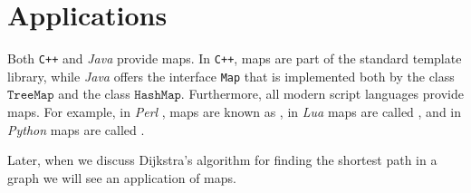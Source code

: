 \section{Applications}
Both \texttt{C++} and \textsl{Java} provide maps.  In \texttt{C++}, maps are part of the standard
template library, while \textsl{Java} offers the interface \texttt{Map} that is implemented both by
the class $\mathtt{TreeMap}$ and the class $\mathtt{HashMap}$. Furthermore, all modern script languages provide maps.
For example, in \textsl{Perl} \cite{Wall92}, maps are known as , in \textsl{Lua} 
\cite{ierusalimschy:2006,Ieru96a} maps are called , and in \textsl{Python} 
\cite{vanRossum:95,lutz:09} maps are called .  

Later, when we discuss Dijkstra's algorithm for finding the shortest path in a graph we will see an
application of maps.


